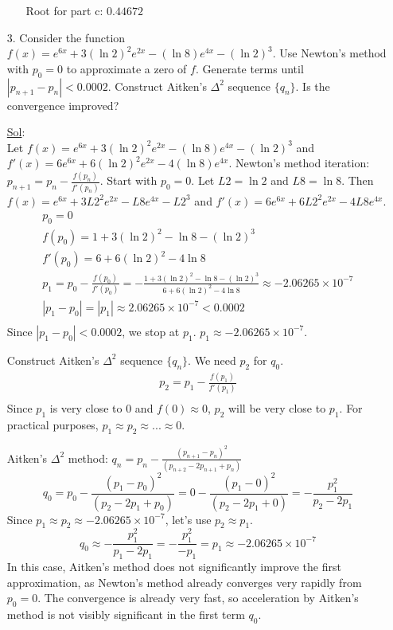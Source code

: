 \begin{enumerate}
\begin{enumerate}
        Root for part c: \( \boxed{0.44672} \)
    \end{enumerate}

  \item[3.] Consider the function \( f(x) = e^{6x} + 3 (\ln 2)^2
    e^{2x} - (\ln 8)e^{4x} - (\ln 2)^3 \). Use Newton's method with
    \( p_0 = 0 \) to approximate a zero of \( f \). Generate terms
    until \( |p_{n+1} - p_n| < 0.0002 \). Construct Aitken's \(
    \Delta^2 \) sequence \( \lbrace q_n \rbrace \). Is the convergence improved?

    \underline{Sol}:\\
    Let \( f(x) = e^{6x} + 3 (\ln 2)^2 e^{2x} - (\ln 8)e^{4x} - (\ln
    2)^3 \) and \( f'(x) = 6e^{6x} + 6 (\ln 2)^2 e^{2x} - 4 (\ln 8)e^{4x} \).
    Newton's method iteration: \( p_{n+1} = p_n -
    \frac{f(p_n)}{f'(p_n)} \). Start with \( p_0 = 0 \).
    Let \( L2 = \ln 2 \) and \( L8 = \ln 8 \). Then \( f(x) = e^{6x}
    + 3 L2^2 e^{2x} - L8 e^{4x} - L2^3 \) and \( f'(x) = 6e^{6x} + 6
    L2^2 e^{2x} - 4 L8 e^{4x} \).
    \[
      \begin{array}{l}
        p_0 = 0 \\
        f(p_0) = 1 + 3 (\ln 2)^2 - \ln 8 - (\ln 2)^3 \\
        f'(p_0) = 6 + 6 (\ln 2)^2 - 4 \ln 8 \\
        p_1 = p_0 - \frac{f(p_0)}{f'(p_0)} = - \frac{1 + 3 (\ln 2)^2
        - \ln 8 - (\ln 2)^3}{6 + 6 (\ln 2)^2 - 4 \ln 8} \approx
        -2.06265 \times 10^{-7} \\
        |p_1 - p_0| = |p_1| \approx 2.06265 \times 10^{-7} < 0.0002 \\
      \end{array}
    \]
    Since \( |p_1 - p_0| < 0.0002 \), we stop at \( p_1 \).  \( p_1
    \approx -2.06265 \times 10^{-7} \).

    Construct Aitken's \( \Delta^2 \) sequence \( \{ q_n \} \). We
    need \( p_2 \) for \( q_0 \).
    \[
      \begin{array}{l}
        p_2 = p_1 - \frac{f(p_1)}{f'(p_1)} \\
      \end{array}
    \]
    Since \( p_1 \) is very close to 0 and \( f(0) \approx 0 \), \(
    p_2 \) will be very close to \( p_1 \).  For practical purposes,
    \( p_1 \approx p_2 \approx ... \approx 0 \).

    Aitken's \( \Delta^2 \) method: \( q_n = p_n - \frac{(p_{n+1} -
    p_n)^2}{(p_{n+2} - 2p_{n+1} + p_n)} \)
    \[
      q_0 = p_0 - \frac{(p_1 - p_0)^2}{(p_2 - 2p_1 + p_0)} = 0 -
      \frac{(p_1 - 0)^2}{(p_2 - 2p_1 + 0)} = - \frac{p_1^2}{p_2 - 2p_1}
    \]
    Since \( p_1 \approx p_2 \approx -2.06265 \times 10^{-7} \),
    let's use \( p_2 \approx p_1 \).
    \[
      q_0 \approx - \frac{p_1^2}{p_1 - 2p_1} = - \frac{p_1^2}{-p_1} =
      p_1 \approx -2.06265 \times 10^{-7}
    \]
    In this case, Aitken's method does not significantly improve the
    first approximation, as Newton's method already converges very
    rapidly from \( p_0 = 0 \). The convergence is already very fast,
    so acceleration by Aitken's method is not visibly significant in
    the first term \( q_0 \).


\end{enumerate}
